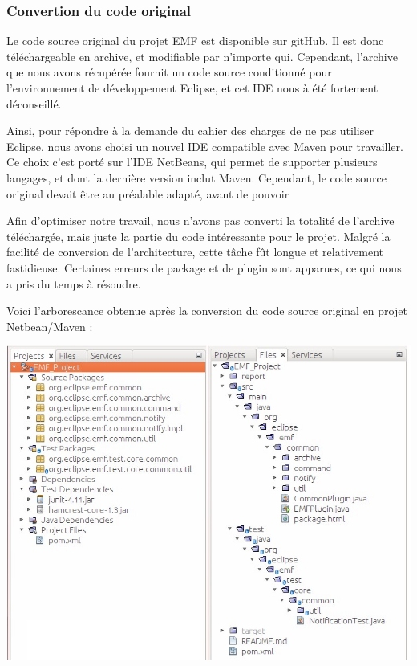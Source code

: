 \documentclass[a4paper]{article}
\begin{document}
		\vspace{0.5cm}

		\subsubsection{Convertion du code original}

		\vspace{0.5cm}

		Le code source original du projet EMF est disponible sur gitHub. Il est donc téléchargeable en archive, et modifiable par n'importe qui. Cependant, l'archive que nous avons récupérée fournit un code source conditionné pour l'environnement de développement Eclipse, et cet IDE nous à été fortement déconseillé.

		\vspace{0.5cm}

		Ainsi, pour répondre à la demande du cahier des charges de ne pas utiliser Eclipse, nous avons choisi un nouvel IDE compatible avec Maven pour travailler. Ce choix c'est porté sur l'IDE NetBeans, qui permet de supporter plusieurs langages, et dont la dernière version inclut Maven. Cependant, le code source original devait être au préalable adapté, avant de pouvoir

		\vspace{0.5cm}

		Afin d'optimiser notre travail, nous n'avons pas converti la totalité de l'archive téléchargée, mais juste la partie du code intéressante pour le projet. Malgré la facilité de conversion de l'architecture, cette tâche fût longue et relativement fastidieuse. Certaines erreurs de package et de plugin sont apparues, ce qui nous a pris du temps à résoudre. 

		\vspace{0.5cm}

		Voici l'arborescance obtenue après la conversion du code source original en projet Netbean/Maven : 

		\begin{center}
			\includegraphics[width=1.0\textwidth]{Arborescence.jpg}~\\
		\end{center}
\end{document}

